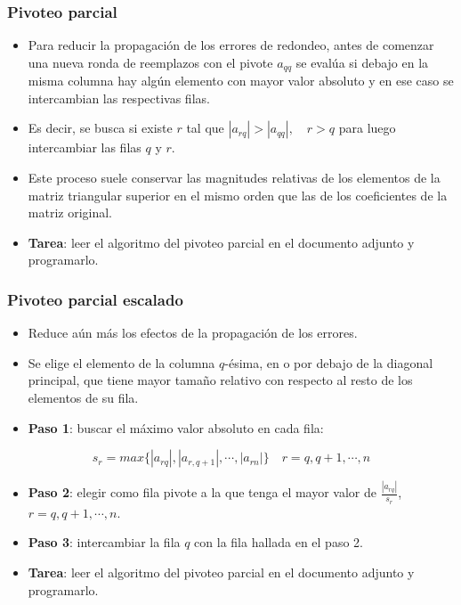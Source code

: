 \documentclass[openany]{book}
\providecommand{\tightlist}{%
  \setlength{\itemsep}{0pt}\setlength{\parskip}{0pt}}
\begin{document}
\hypertarget{pivoteo-parcial}{%
\subsubsection*{Pivoteo parcial}\label{pivoteo-parcial}}

\begin{itemize}
\tightlist
\item
  Para reducir la propagación de los errores de redondeo, antes de comenzar una nueva ronda de reemplazos con el pivote \(a_{qq}\) se evalúa si debajo en la misma columna hay algún elemento con mayor valor absoluto y en ese caso se intercambian las respectivas filas.
\item
  Es decir, se busca si existe \(r\) tal que \(|a_{rq}| > |a_{qq}|,\quad r>q\) para luego intercambiar las filas \(q\) y \(r\).
\item
  Este proceso suele conservar las magnitudes relativas de los elementos de la matriz triangular superior en el mismo orden que las de los coeficientes de la matriz original.
\item
  \textbf{Tarea}: leer el algoritmo del pivoteo parcial en el documento adjunto y programarlo.
\end{itemize}

\hypertarget{pivoteo-parcial-escalado}{%
\subsubsection*{Pivoteo parcial escalado}\label{pivoteo-parcial-escalado}}

\begin{itemize}
\tightlist
\item
  Reduce aún más los efectos de la propagación de los errores.
\item
  Se elige el elemento de la columna \(q\)-ésima, en o por debajo de la diagonal principal, que tiene mayor tamaño relativo con respecto al resto de los elementos de su fila.
\item
  \textbf{Paso 1}: buscar el máximo valor absoluto en cada fila:
\end{itemize}

\[
s_r = max\{|a_{rq}|, |a_{r,q+1}|, \cdots, |a_{rn}| \} \quad r = q, q+1, \cdots, n
\]

\begin{itemize}
\tightlist
\item
  \textbf{Paso 2}: elegir como fila pivote a la que tenga el mayor valor de \(\frac{|a_{rq}|}{s_r}\), \(r = q, q+1, \cdots, n\).
\item
  \textbf{Paso 3}: intercambiar la fila \(q\) con la fila hallada en el paso 2.
\item
  \textbf{Tarea}: leer el algoritmo del pivoteo parcial en el documento adjunto y programarlo.
\end{itemize}
\end{document}

